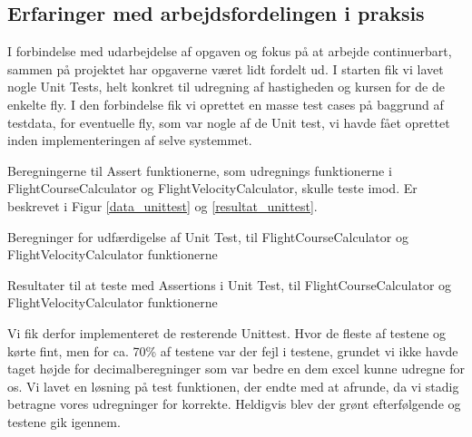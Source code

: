 \subsection{Erfaringer med arbejdsfordelingen i praksis}

I forbindelse med udarbejdelse af opgaven og fokus på at arbejde continuerbart, sammen på projektet
har opgaverne været lidt fordelt ud. I starten fik vi lavet nogle Unit Tests, 
helt konkret til udregning af hastigheden og kursen for de de enkelte fly.
I den forbindelse fik vi oprettet en masse test cases på baggrund af testdata, for eventuelle fly, 
som var nogle af de Unit test, vi havde fået oprettet inden implementeringen af selve systemmet.

Beregningerne til Assert funktionerne, som udregnings funktionerne i FlightCourseCalculator og FlightVelocityCalculator, 
skulle teste imod. Er beskrevet i Figur \ref{data_unittest} og \ref{resultat_unittest}.

 {Beregninger for udfærdigelse af Unit Test, til FlightCourseCalculator og FlightVelocityCalculator funktionerne}

 {Resultater til at teste med Assertions i Unit Test, til FlightCourseCalculator og FlightVelocityCalculator funktionerne}

Vi fik derfor implementeret de resterende Unittest. Hvor de fleste af testene og kørte fint, 
men for ca. 70\% af testene var der fejl i testene, 
grundet vi ikke havde taget højde for decimalberegninger som var bedre en dem excel kunne udregne for os. Vi lavet en løsning på test funktionen, 
der endte med at afrunde, da vi stadig betragne vores udregninger for korrekte. Heldigvis blev der grønt efterfølgende og testene gik igennem.